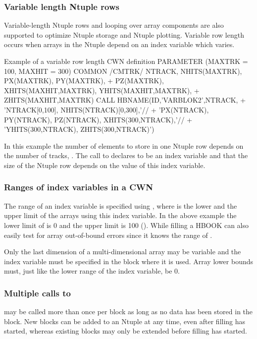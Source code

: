 \subsubsection{Variable length Ntuple rows}
Variable-length Ntuple rows and looping over array components
are also supported to optimize Ntuple storage and Ntuple plotting.
Variable row length occurs when arrays in the Ntuple
depend on an index variable which varies.

\finalnewpage

\begin{XMPt}{Example of a variable row length CWN definition}
      PARAMETER (MAXTRK = 100, MAXHIT = 300)
      COMMON /CMTRK/ NTRACK, NHITS(MAXTRK), PX(MAXTRK), PY(MAXTRK),
     +               PZ(MAXTRK), XHITS(MAXHIT,MAXTRK), YHITS(MAXHIT,MAXTRK),
     +               ZHITS(MAXHIT,MAXTRK)
      CALL HBNAME(ID,'VARBLOK2',NTRACK,
     +            'NTRACK[0,100], NHITS(NTRACK)[0,300],'//
     +            'PX(NTRACK), PY(NTRACK), PZ(NTRACK), XHITS(300,NTRACK),'//
     +            'YHITS(300,NTRACK), ZHITS(300,NTRACK)')
\end{XMPt}

In this example the number of elements to store in one Ntuple row
depends on the number of tracks, .
The call to  declares  to be an
index variable and that the size of the Ntuple row depends on the value of
this index variable.

\subsubsection{Ranges of index variables in a CWN}
The range of an index variable is specified using \Lit{[<l>,<u>]},
where  is the lower and  the upper limit of the arrays
using this index variable. In the above example the
lower limit of  is 0 and the upper limit is 100 ().
While filling a \CWN{} HBOOK can also easily test for
array out-of-bound errors since it knows the range of .

Only the last dimension of a multi-dimensional array may be variable
and the index variable must be specified in the block where it is used.
Array lower bounds must, just like the lower range of the index variable,
be 0.

\subsubsection{Multiple calls to }
 may be called more than once per block as long as no data
has been stored in the block.
New blocks can be added to an Ntuple at any time, even after filling has
 started,
whereas existing blocks may only be extended before filling has started.


